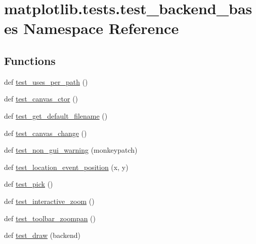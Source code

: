 \hypertarget{namespacematplotlib_1_1tests_1_1test__backend__bases}{}\section{matplotlib.\+tests.\+test\+\_\+backend\+\_\+bases Namespace Reference}
\label{namespacematplotlib_1_1tests_1_1test__backend__bases}
\subsection*{Functions}
\begin{DoxyCompactItemize}
\item 
def \hyperlink{namespacematplotlib_1_1tests_1_1test__backend__bases_a3da4c3cc15ae06f986f0a88a628c106a}{test\+\_\+uses\+\_\+per\+\_\+path} ()
\item 
def \hyperlink{namespacematplotlib_1_1tests_1_1test__backend__bases_a2905eb71fb3d73bbd757444e4783e958}{test\+\_\+canvas\+\_\+ctor} ()
\item 
def \hyperlink{namespacematplotlib_1_1tests_1_1test__backend__bases_acdc68d0966180ce08e0754c199df9e61}{test\+\_\+get\+\_\+default\+\_\+filename} ()
\item 
def \hyperlink{namespacematplotlib_1_1tests_1_1test__backend__bases_afebad1ee48d701f7bb466a535f339057}{test\+\_\+canvas\+\_\+change} ()
\item 
def \hyperlink{namespacematplotlib_1_1tests_1_1test__backend__bases_a8cf4a2a9e4bdcb7fa4656313819a8e5b}{test\+\_\+non\+\_\+gui\+\_\+warning} (monkeypatch)
\item 
def \hyperlink{namespacematplotlib_1_1tests_1_1test__backend__bases_a80f68e877ed6fb8ba8f31ab94b7b3725}{test\+\_\+location\+\_\+event\+\_\+position} (x, y)
\item 
def \hyperlink{namespacematplotlib_1_1tests_1_1test__backend__bases_affc37463b0b7d3d7d44517b6a5ca618e}{test\+\_\+pick} ()
\item 
def \hyperlink{namespacematplotlib_1_1tests_1_1test__backend__bases_a3955f13a87aa50637647b831cf0130e6}{test\+\_\+interactive\+\_\+zoom} ()
\item 
def \hyperlink{namespacematplotlib_1_1tests_1_1test__backend__bases_a4493c6cb84388ca77472897a178a3f35}{test\+\_\+toolbar\+\_\+zoompan} ()
\item 
def \hyperlink{namespacematplotlib_1_1tests_1_1test__backend__bases_aff5e4a301c643d5264f8627e7dc01303}{test\+\_\+draw} (backend)
\end{DoxyCompactItemize}
